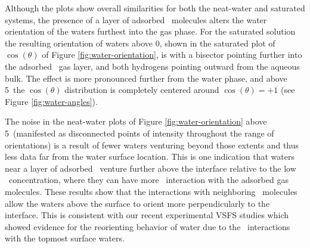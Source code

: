 Although the plots show overall similarities for both the neat-water and saturated systems, the presence of a layer of adsorbed \suldiox~molecules alters the water orientation of the waters furthest into the gas phase. For the saturated solution the resulting orientation of waters above 0\angs, shown in the saturated plot of $\cos(\theta)$ of Figure \ref{fig:water-orientation}, is with a bisector pointing further into the adsorbed \suldiox~gas layer, and both hydrogens pointing outward from the aqueous bulk. The effect is more pronounced further from the water phase, and above 5\angs~the $\cos(\theta)$ distribution is completely centered around $\cos(\theta)=+1$ (see Figure \ref{fig:water-angles}).


The noise in the neat-water plots of Figure \ref{fig:water-orientation} above 5\angs~(manifested as disconnected points of intensity throughout the range of orientations) is a result of fewer waters venturing beyond those extents and thus less data far from the water surface location. This is one indication that waters near a layer of adsorbed \suldiox~venture further above the interface relative to the low \suldiox~concentration, where they can have more \suldiox~interaction with the adsorbed gas molecules. These results show that the interactions with neighboring \suldiox~molecules allow the waters above the surface to orient more perpendicularly to the interface. This is consistent with our recent experimental VSFS studies which showed evidence for the reorienting behavior of water due to the \suldiox~interactions with the topmost surface waters.\cite{Ota2011}

